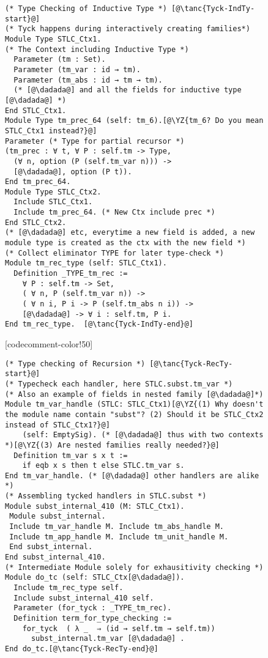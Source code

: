 \begin{figure}

\begin{minipage}{\textwidth}
\begin{multicols}{2}




\begin{lstlisting}
(* Type Checking of Inductive Type *) [@\tanc{Tyck-IndTy-start}@]
(* Tyck happens during interactively creating families*)
Module Type STLC_Ctx1. 
(* The Context including Inductive Type *)
  Parameter (tm : Set).
  Parameter (tm_var : id → tm).
  Parameter (tm_abs : id → tm → tm).
  (* [@\dadada@] and all the fields for inductive type [@\dadada@] *)
End STLC_Ctx1.
Module Type tm_prec_64 (self: tm_6).[@\YZ{tm_6? Do you mean STLC_Ctx1 instead?}@]
Parameter (* Type for partial recursor *)
(tm_prec : ∀ t, ∀ P : self.tm -> Type,
  (∀ n, option (P (self.tm_var n))) -> 
  [@\dadada@], option (P t)).
End tm_prec_64.
Module Type STLC_Ctx2.  
  Include STLC_Ctx1.
  Include tm_prec_64. (* New Ctx include prec *)
End STLC_Ctx2.
(* [@\dadada@] etc, everytime a new field is added, a new 
module type is created as the ctx with the new field *)
(* Collect eliminator TYPE for later type-check *)
Module tm_rec_type (self: STLC_Ctx1).
  Definition _TYPE_tm_rec :=
    ∀ P : self.tm -> Set,
    ( ∀ n, P (self.tm_var n)) ->
    ( ∀ n i, P i -> P (self.tm_abs n i)) ->
    [@\dadada@] -> ∀ i : self.tm, P i.
End tm_rec_type.  [@\tanc{Tyck-IndTy-end}@]
\end{lstlisting}

[codecomment-color!50]



\begin{lstlisting}
(* Type checking of Recursion *) [@\tanc{Tyck-RecTy-start}@]
(* Typecheck each handler, here STLC.subst.tm_var *)
(* Also an example of fields in nested family [@\dadada@]*) 
Module tm_var_handle (STLC: STLC_Ctx1)[@\YZ{(1) Why doesn't the module name contain "subst"? (2) Should it be STLC_Ctx2 instead of STLC_Ctx1?}@]
    (self: EmptySig). (* [@\dadada@] thus with two contexts *)[@\YZ{(3) Are nested families really needed?}@]
  Definition tm_var s x t := 
    if eqb x s then t else STLC.tm_var s.
End tm_var_handle. (* [@\dadada@] other handlers are alike *)
(* Assembling tycked handlers in STLC.subst *)
Module subst_internal_410 (M: STLC_Ctx1). 
 Module subst_internal.
 Include tm_var_handle M. Include tm_abs_handle M.
 Include tm_app_handle M. Include tm_unit_handle M.
 End subst_internal.
End subst_internal_410.
(* Intermediate Module solely for exhausitivity checking *) 
Module do_tc (self: STLC_Ctx[@\dadada@]).
  Include tm_rec_type self. 
  Include subst_internal_410 self.
  Parameter (for_tyck : _TYPE_tm_rec).
  Definition term_for_type_checking :=
    for_tyck  ( λ _  ⇒ (id → self.tm → self.tm))
      subst_internal.tm_var [@\dadada@] .
End do_tc.[@\tanc{Tyck-RecTy-end}@]
\end{lstlisting}


\end{multicols}
\end{minipage}
\end{figure}
